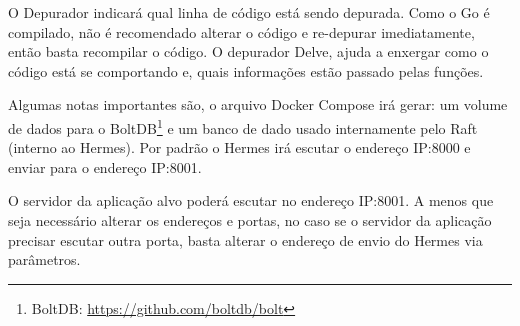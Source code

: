 O Depurador indicará qual linha de código está sendo depurada. Como o Go é compilado, não é recomendado alterar o código e re-depurar imediatamente, então basta recompilar o código. O depurador Delve, ajuda a enxergar como o código está se comportando e, quais informações estão passado pelas funções.

Algumas notas importantes são, o arquivo Docker Compose irá gerar: um volume de dados para o BoltDB\footnote{BoltDB: \url{https://github.com/boltdb/bolt}} e um banco de dado usado internamente pelo Raft (interno ao Hermes). Por padrão o Hermes irá escutar o endereço \gls{IP}:8000 e enviar para o endereço \gls{IP}:8001.

O servidor da aplicação alvo poderá escutar no endereço \gls{IP}:8001. A menos que seja necessário alterar os endereços e portas, no caso se o servidor da aplicação precisar escutar outra porta, basta alterar o endereço de envio do Hermes via parâmetros.

